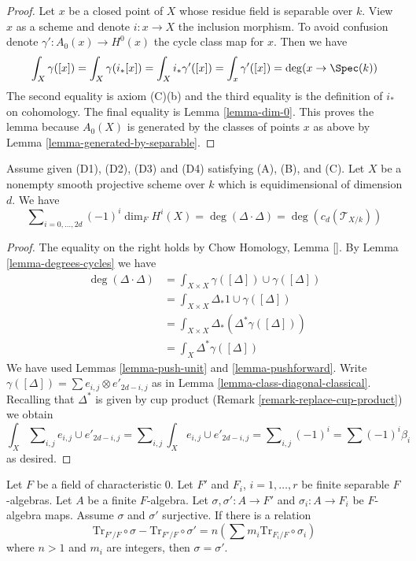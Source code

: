 \begin{proof}
Let $x$ be a closed point of $X$ whose residue field is separable
over $k$. View $x$ as a scheme and denote $i : x \to X$ the inclusion morphism.
To avoid confusion denote $\gamma' : A_0(x) \to H^0(x)$ the cycle class map
for $x$. Then we have
$$
\int_X \gamma([x]) = \int_X \gamma(i_*[x]) =
\int_X i_*\gamma'([x]) = \int_x \gamma'([x]) = \deg(x \to \Spec(k))
$$
The second equality is axiom (C)(b) and the third equality is
the definition of $i_*$ on cohomology. The final equality is
Lemma \ref{lemma-dim-0}. This proves the lemma
because $A_0(X)$ is generated by the classes of points $x$ as above
by Lemma \ref{lemma-generated-by-separable}.
\end{proof}

\begin{lemma}
\label{lemma-square-diagonal}
Assume given (D1), (D2), (D3) and (D4) satisfying (A), (B), and (C).
Let $X$ be a nonempty smooth projective scheme over $k$ which is
equidimensional of dimension $d$. We have
$$
\sum\nolimits_{i = 0, \ldots, 2d} (-1)^i\dim_F H^i(X) =
\deg(\Delta \cdot \Delta) = \deg(c_d(\mathcal{T}_{X/k}))
$$
\end{lemma}

\begin{proof}
The equality on the right holds by Chow Homology, Lemma \ref{}.
By Lemma \ref{lemma-degrees-cycles} we have
\begin{align*}
\deg(\Delta \cdot \Delta)
& =
\int_{X \times X} \gamma([\Delta]) \cup \gamma([\Delta]) \\
& =
\int_{X \times X} \Delta_*1 \cup \gamma([\Delta]) \\
& =
\int_{X \times X} \Delta_*(\Delta^*\gamma([\Delta])) \\
& =
\int_X \Delta^*\gamma([\Delta])
\end{align*}
We have used Lemmas \ref{lemma-push-unit} and
\ref{lemma-pushforward}.
Write $\gamma([\Delta]) = \sum  e_{i, j} \otimes e'_{2d - i , j}$
as in Lemma \ref{lemma-class-diagonal-classical}.
Recalling that $\Delta^*$ is given by cup product
(Remark \ref{remark-replace-cup-product}) we obtain
$$
\int_X \sum\nolimits_{i, j} e_{i, j} \cup e'_{2d - i, j} =
\sum\nolimits_{i, j} \int_X e_{i, j} \cup e'_{2d - i, j} =
\sum\nolimits_{i, j} (-1)^i = \sum (-1)^i\beta_i
$$
as desired.
\end{proof}

\begin{lemma}
\label{lemma-algebra-relations}
Let $F$ be a field of characteristic $0$.
Let $F'$ and $F_i$, $i = 1, \ldots, r$
be finite separable $F$-algebras. Let $A$ be a finite $F$-algebra.
Let $\sigma, \sigma' : A \to F'$ and $\sigma_i : A \to F_i$
be $F$-algebra maps. Assume $\sigma$ and $\sigma'$ surjective.
If there is a relation
$$
\text{Tr}_{F'/F} \circ \sigma - \text{Tr}_{F'/F} \circ \sigma' =
n(\sum m_i \text{Tr}_{F_i/F} \circ \sigma_i)
$$
where $n > 1$ and $m_i$ are integers, then $\sigma = \sigma'$.
\end{lemma}

